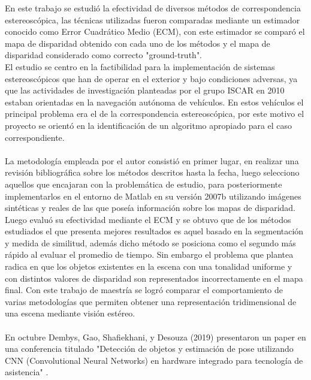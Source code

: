 En este trabajo se estudió la efectividad de diversos métodos de correspondencia estereoscópica, las técnicas utilizadas fueron comparadas mediante un estimador conocido como Error Cuadrático Medio (ECM), con este estimador se comparó el mapa de disparidad obtenido con cada uno de los métodos y el mapa de disparidad considerado como correcto "ground-truth". 
\\
El estudio se centro en la factibilidad para la implementación de sistemas estereoscópicos que han de operar en el exterior y bajo condiciones adversas, ya que las actividades de investigación planteadas por el grupo ISCAR en 2010 estaban orientadas en la navegación autónoma de vehículos. En estos vehículos el principal problema era el de la correspondencia estereoscópica, por este motivo el proyecto se orientó en la identificación de un algoritmo apropiado para el caso correspondiente.
\\
\\
La metodología empleada por el autor consistió en primer lugar, en realizar una revisión bibliográfica sobre los métodos descritos hasta la fecha, luego selecciono aquellos que encajaran con la problemática de estudio, para posteriormente implementarlos en el entorno de Matlab en su versión 2007b utilizando imágenes sintéticas y reales de las que poseía información sobre los mapas de disparidad. Luego evaluó su efectividad mediante el ECM y se obtuvo que de los métodos estudiados el que presenta mejores resultados es aquel basado en la segmentación y medida de similitud, además dicho método se posiciona como el segundo más rápido al evaluar el promedio de tiempo. Sin embargo el problema que plantea radica en que los objetos existentes en la escena con una tonalidad uniforme y con distintos valores de disparidad son representados incorrectamente en el mapa final. Con este trabajo de maestría se logró comparar el comportamiento de varias metodologías que permiten obtener una representación tridimensional de una escena mediante visión estéreo.
\\
\\
En octubre Dembys, Gao, Shafiekhani, y Desouza (2019) presentaron un paper en una conferencia titulado "Detección de objetos y estimación de pose utilizando CNN (Convolutional Neural Networks) en hardware integrado para tecnología de asistencia" \cite{AssistiveTech}.
\\
\\
